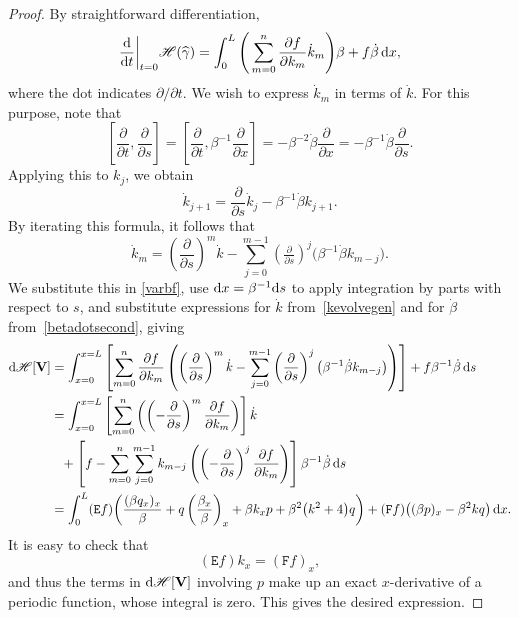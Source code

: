 \documentclass[pdftex]{sigma}
\def\Fop{\mathtt F} %
\def\Euler{\mathtt E}
\newcommand\kk{k} %
\newcommand\speed{\beta} %
\newcommand\VV{\mathbf V}
\newcommand\funH{{\mathscr H}} %
\newcommand{\dx}{\,{\rm d}x}
\newcommand{\ds}{\,{\rm d}s}
\def\gam{\gamma} %
\def\di{\partial}
\newcommand\gamf{\widehat{\gam}} %
\numberwithin{equation}{section}
\begin{document}
\begin{proof}
By straightforward differentiation,
\begin{equation}\label{varbf}
\dfrac{{\rm d}}{{\rm d}t}\bigg|_{t=0} \funH(\gamf)
=\int_0^L \Bigg(\sum_{m=0}^n \dfrac{\di f}{\di \kk_m} \dot\kk_m\Bigg) \speed + f \dot{\speed} \dx,
\end{equation}
where the dot indicates $\di/\di t$.
We wish to express $\dot\kk_m$ in terms of $\dot\kk$. For this purpose, note that
\[\left[\frac{\di}{\di t}, \frac{\di}{\di s}\right] = \left[\frac{\di}{\di t}, \speed^{-1} \frac{\di}{\di x}\right] =
-\speed^{-2} \dot\speed \frac{\di }{\di x} = -\speed^{-1} \dot\speed \frac{\di }{\di s}.\]
Applying this to $\kk_j$, we obtain
\[\dot\kk_{j+1} = \frac{\di}{\di s} \dot\kk_j -\speed^{-1} \dot\speed \kk_{j+1}.\]
By iterating this formula, it follows that
\[\dot\kk_m = \left(\frac{\di}{\di s}\right)^m \dot \kk - \sum_{j=0}^{m-1} \left(\tfrac{\di}{\di s}\right)^j \bigl( \speed^{-1} \dot\speed \kk_{m-j}\bigr).\]
We substitute this in \eqref{varbf}, use ${\rm d}x=\speed^{-1} {\rm d}s$ to apply integration by parts with respect to $s$, and substitute expressions for $\dot{k}$ from~\eqref{kevolvegen} and for $\dot{\beta}$ from~\eqref{betadotsecond}, giving
\begin{align*}
{\rm d}\funH[\VV] &= \int_{x=0}^{x=L} \left[\sum_{m=0}^n \dfrac{\di f}{\di \kk_m}
\left(\left(\frac{\di}{\di s}\right)^m \dot \kk - \sum_{j=0}^{m-1} \left(\frac{\di}{\di s}\right)^j \bigl( \speed^{-1} \dot\speed \kk_{m-j}\bigr)\right)\right] + f \speed^{-1} \dot\speed \ds \\
&= \int_{x=0}^{x=L} \left[ \sum_{m=0}^n \left( \left(-\frac{\di}{\di s}\right)^m \dfrac{\di f}{\di \kk_m} \right) \right] \dot \kk \\
&\hphantom{=} + \left[ f - \sum_{m=0}^n \sum_{j=0}^{m-1} \kk_{m-j} \left(\left(-\frac{\di}{\di s}\right)^j \dfrac{\di f}{\di \kk_m}\right) \right] \speed^{-1} \dot\speed \ds
\\
&= \int_{0}^{L} (\Euler f)\biggl( \dfrac{(\speed q_x)_x}{\speed}
+ q\left( \dfrac{\speed_x}{\speed}\right)_x
+ \speed \kk_x p + \speed^2\bigl(\kk^2 + 4\bigr) q\biggr) + (\Fop f) \bigl( (\speed p)_x - \speed^2 k q\bigr) \dx.
\end{align*}
It is easy to check that
\begin{equation}\label{Eulerfident}
(\Euler f) k_x = (\Fop f)_x,
\end{equation}
and thus the terms in ${\rm d}\funH[\VV]$ involving $p$ make up an exact $x$-derivative of a periodic function, whose integral is zero. This gives the desired expression.
\end{proof}
\end{document}
